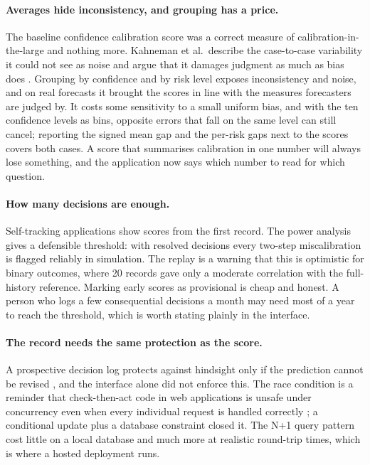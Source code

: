 \documentclass[12pt,a4paper]{article}
\begin{document}
\paragraph{Averages hide inconsistency, and grouping has a price.} The baseline confidence calibration score was a correct measure of calibration-in-the-large and nothing more. Kahneman et al.\ describe the case-to-case variability it could not see as noise and argue that it damages judgment as much as bias does \cite{kahneman2021}. Grouping by confidence and by risk level exposes inconsistency and noise, and on real forecasts it brought the scores in line with the measures forecasters are judged by. It costs some sensitivity to a small uniform bias, and with the ten confidence levels as bins, opposite errors that fall on the same level can still cancel; reporting the signed mean gap and the per-risk gaps next to the scores covers both cases. A score that summarises calibration in one number will always lose something, and the application now says which number to read for which question.

\paragraph{How many decisions are enough.} Self-tracking applications show scores from the first record. The power analysis gives a defensible threshold: with \MinimumHistory{} resolved decisions every two-step miscalibration is flagged reliably in simulation. The replay is a warning that this is optimistic for binary outcomes, where 20 records gave only a moderate correlation with the full-history reference. Marking early scores as provisional is cheap and honest. A person who logs a few consequential decisions a month may need most of a year to reach the threshold, which is worth stating plainly in the interface.

\paragraph{The record needs the same protection as the score.} A prospective decision log protects against hindsight only if the prediction cannot be revised \cite{fischhoff1975}, and the interface alone did not enforce this. The race condition is a reminder that check-then-act code in web applications is unsafe under concurrency even when every individual request is handled correctly \cite{warszawski2017}; a conditional update plus a database constraint closed it. The N+1 query pattern cost little on a local database and much more at realistic round-trip times, which is where a hosted deployment runs.
\end{document}
